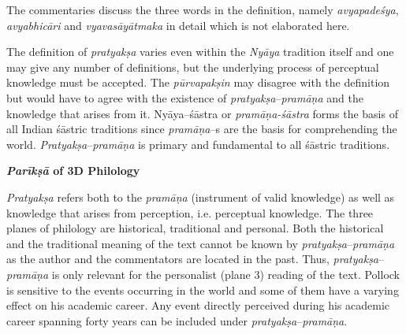 The commentaries discuss the three words in the definition, namely \textit{avyapadeśya}, \textit{avyabhicāri} and \textit{vyavasāyātmaka} in detail which is not elaborated here.

The definition of \textit{pratyakṣa} varies even within the \textit{Nyāya} tradition itself and one may give any number of definitions, but the underlying process of perceptual knowledge must be accepted. The \textit{pūrvapakṣin} may disagree with the definition but would have to agree with the existence of \textit{pratyakṣa}–\textit{pramāṇa} and the knowledge that arises from it. Nyāya–śāstra or \textit{pramāṇa-śāstra} forms the basis of all Indian śāstric traditions since\textit{ pramāṇa}–s are the basis for comprehending the world. \textit{Pratyakṣa}–\textit{pramāṇa }is primary and fundamental to all śāstric traditions.


\textbf{\textit{Parīkṣā} of 3D Philology}

\textit{Pratyakṣa} refers both to the \textit{pramāṇa} (instrument of valid knowledge) as well as knowledge that arises from perception, i.e. perceptual knowledge. The three planes of philology are historical, traditional and personal. Both the historical and the traditional meaning of the text cannot be known by \textit{pratyakṣa}–\textit{pramāṇa} as the author and the commentators are located in the past. Thus, \textit{pratyakṣa}–\textit{pramāṇa }is only relevant for the personalist (plane 3) reading of the text. Pollock is sensitive to the events occurring in the world and some of them have a varying effect on his academic career. Any event directly perceived during his academic career spanning forty years can be included under \textit{pratyakṣa}–\textit{pramāṇa}.

\vspace{-.3cm}

